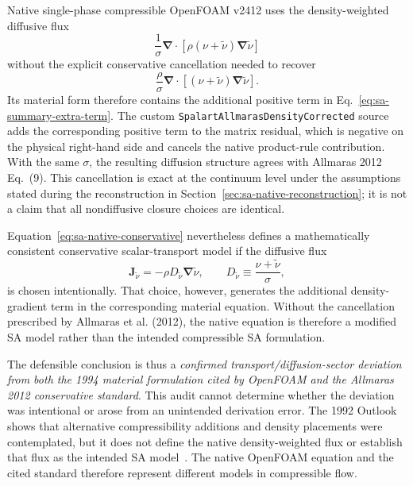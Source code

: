 \documentclass[11pt]{article}
\newcommand{\SAgrad}{\boldsymbol{\nabla}}
\newcommand{\SAdiv}{\boldsymbol{\nabla}\!\cdot}
\newcommand{\SAcode}[1]{\texttt{#1}}
\newcommand{\SAOF}{OpenFOAM}
\newcommand{\SAnote}[2]{%
  \vspace{0.3em}%
  \noindent\colorbox{#1}{%
    \begin{minipage}{0.965\linewidth}
      #2
    \end{minipage}}%
  \vspace{0.3em}%
}
\begin{document}
\SAnote{SAHypLightGreen}{%
Native single-phase compressible \SAOF{} v2412 uses the density-weighted
diffusive flux
\[
  \frac{1}{\sigma}\SAdiv\!\left[
    \rho(\nu+\widetilde{\nu})\SAgrad\widetilde{\nu}
  \right]
\]
without the explicit conservative cancellation needed to recover
\[
  \frac{\rho}{\sigma}\SAdiv\!\left[
    (\nu+\widetilde{\nu})\SAgrad\widetilde{\nu}
  \right].
\]
Its material form therefore contains the additional positive term in
Eq.~\eqref{eq:sa-summary-extra-term}.  The custom
\SAcode{SpalartAllmarasDensityCorrected} source adds the corresponding positive
term to the matrix residual, which is negative on the physical right-hand side
and cancels the native product-rule contribution.  With the same \(\sigma\),
the resulting diffusion structure agrees with Allmaras 2012 Eq.~(9).  This
    cancellation is exact at the continuum level under the assumptions stated
    during the reconstruction in Section~\ref{sec:sa-native-reconstruction};
    it is not a claim that all nondiffusive closure choices are identical.
}

Equation~\eqref{eq:sa-native-conservative} nevertheless defines a
mathematically consistent conservative scalar-transport model if the diffusive
flux
\begin{equation}
  \boldsymbol J_{\widetilde{\nu}}
  =-\rho D_{\widetilde{\nu}}\SAgrad\widetilde{\nu},
  \qquad
  D_{\widetilde{\nu}}\equiv\frac{\nu+\widetilde{\nu}}{\sigma},
  \label{eq:sa-native-fickian-flux}
\end{equation}
is chosen intentionally.  That choice, however, generates the additional
density-gradient term in the corresponding material equation.  Without the
cancellation prescribed by Allmaras et al. (2012), the native equation is
therefore a modified SA model rather than the intended compressible SA
formulation.

The defensible conclusion is thus a \emph{confirmed
transport/diffusion-sector deviation from both the 1994 material formulation
cited by \SAOF{} and the Allmaras 2012 conservative standard}.  This audit
cannot determine whether the deviation was intentional or arose from an
unintended derivation error.  The 1992 Outlook shows that alternative
compressibility additions and density placements were contemplated, but it
does not define the native density-weighted flux or establish that flux as the
intended SA model~\cite{SpalartAllmaras1994,SpalartAllmaras1992,AJS2012}.  The
native \SAOF{} equation and the cited standard therefore represent different
models in compressible flow.
\end{document}
